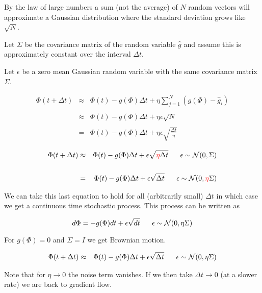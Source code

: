 {\vfill
By the law of large numbers a sum (not the average) of $N$ random vectors will approximate a Gaussian distribution where the standard deviation
grows like $\sqrt{N}$.


Let $\Sigma$ be the covariance matrix of the random variable $\hat{g}$ and assume this is approximately constant over the interval $\Delta t$.

\vfill
Let $\epsilon$ be a zero mean Gaussian random variable with the same covariance matrix $\Sigma$.

\begin{eqnarray*}
\Phi(t + \Delta t) & \approx & \Phi(t) -g(\Phi)\Delta t + \eta \sum_{j=1}^N (g(\Phi) - \hat{g}_i) \\
\\
& \approx & \Phi(t) -g(\Phi)\Delta t + \eta \epsilon \sqrt{N} \\
\\
& = & \Phi(t) -g(\Phi)\Delta t + \eta \epsilon \sqrt{\frac{\Delta t}{\eta}}
\end{eqnarray*}



\begin{eqnarray*}
\Phi(t + \Delta t) & \approx & \Phi(t) -g(\Phi)\Delta t + \epsilon \sqrt{{\color{red} \eta}\Delta t}\;\;\;\;\;\; \epsilon \sim {\cal N}(0,\Sigma) \\
\\
& = & \Phi(t) -g(\Phi)\Delta t + \epsilon \sqrt{\Delta t}\;\;\;\;\;\; \epsilon \sim {\cal N}(0,{\color{red} \eta}\Sigma)
\end{eqnarray*}

\vfill
We can take this last equation to hold for all (arbitrarily small) $\Delta t$ in which case we get a continuous time stochastic process.  This process can be written as

{\color{red} $$d\Phi =  -g(\Phi)dt + \epsilon \sqrt{dt}\;\;\;\;\;\; \epsilon \sim {\cal N}(0,\eta\Sigma)$$}

\vfill
For $g(\Phi) = 0$ and $\Sigma = I$ we get Brownian motion.


\begin{eqnarray*}
\Phi(t + \Delta t) & \approx & \Phi(t) -g(\Phi)\Delta t + \epsilon\sqrt{\Delta t}\;\;\;\;\;\; \epsilon \sim {\cal N}(0,\eta\Sigma)
\end{eqnarray*}

\vfill
Note that for $\eta \rightarrow 0$ the noise term vanishes.  If we then take $\Delta t \rightarrow 0$ (at a slower rate) we are back to gradient flow.

}
